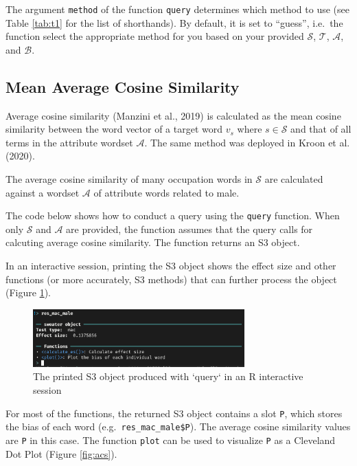 \documentclass[english,man]{apa6}
\begin{document}
The argument \texttt{method} of the function \texttt{query} determines which method to use (see Table \ref{tab:t1} for the list of shorthands). By default, it is set to \enquote{guess}, i.e.~the function select the appropriate method for you based on your provided \(\mathcal{S}\), \(\mathcal{T}\), \(\mathcal{A}\), and \(\mathcal{B}\).

\hypertarget{mean-average-cosine-similarity}{%
\subsection{Mean Average Cosine Similarity}\label{mean-average-cosine-similarity}}

Average cosine similarity (Manzini et al., 2019) is calculated as the mean cosine similarity between the word vector of a target word \(v_s\) where \(s \in \mathcal{S}\) and that of all terms in the attribute wordset \({\mathcal{A}}\). The same method was deployed in Kroon et al. (2020).

The average cosine similarity of many occupation words in \(\mathcal{S}\) are calculated against a wordset \(\mathcal{A}\) of attribute words related to male.

The code below shows how to conduct a query using the \texttt{query} function. When only \(\mathcal{S}\) and \(\mathcal{A}\) are provided, the function assumes that the query calls for calcuting average cosine similarity. The function returns an S3 object.

In an interactive session, printing the S3 object shows the effect size and other functions (or more accurately, S3 methods) that can further process the object (Figure \ref{fig:interactive}).

\begin{figure}
\includegraphics[width=3.21in]{sweaterf1} \caption{The printed S3 object produced with `query` in an R interactive session}\label{fig:interactive}
\end{figure}

For most of the functions, the returned S3 object contains a slot \texttt{P}, which stores the bias of each word (e.g.~\texttt{res\_mac\_male\$P}). The average cosine similarity values are \texttt{P} in this case. The function \texttt{plot} can be used to visualize \texttt{P} as a Cleveland Dot Plot (Figure \ref{fig:acs}).
\end{document}
